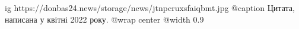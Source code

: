  
 
 
 
 

\ifcmt
  ig https://donbas24.news/storage/news/jtnpcruxsfaiqbmt.jpg
	@caption Цитата, написана у квітні 2022 року.
  @wrap center
  @width 0.9
\fi
